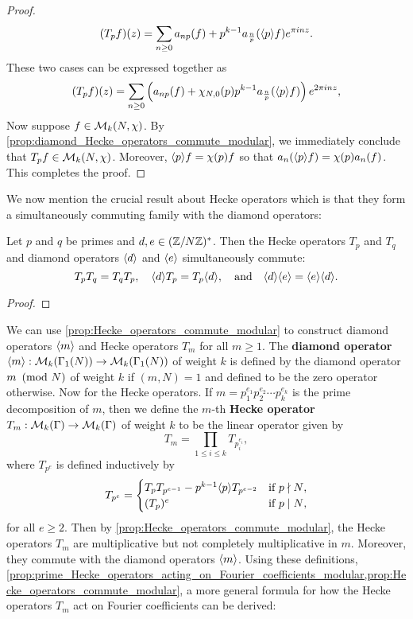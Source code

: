 \begin{proof}
        \[
          (T_{p}f)(z) = \sum_{n \ge 0}a_{np}(f)+p^{k-1}a_{\frac{n}{p}}(\langle p\rangle f)e^{\pi inz}.
        \]
        These two cases can be expressed together as 
        \[
          (T_{p}f)(z) = \sum_{n \ge 0}\left(a_{np}(f)+\chi_{N,0}(p)p^{k-1}a_{\frac{n}{p}}(\langle p\rangle f)\right)e^{2\pi inz},
        \]
        Now suppose $f \in \mathcal{M}_{k}(N,\chi)$. By \cref{prop:diamond_Hecke_operators_commute_modular}, we immediately conclude that $T_{p}f \in \mathcal{M}_{k}(N,\chi)$. Moreover, $\langle p\rangle f = \chi(p)f$ so that $a_{n}(\langle p\rangle f) = \chi(p)a_{n}(f)$. This completes the proof.
      \end{proof}

      We now mention the crucial result about Hecke operators which is that they form a simultaneously commuting family with the diamond operators:

      \begin{proposition}\label{prop:Hecke_operators_commute_modular}
        Let $p$ and $q$ be primes and $d,e \in (\mathbb{Z}/N\mathbb{Z})^{\ast}$. Then the Hecke operators $T_{p}$ and $T_{q}$ and diamond operators $\langle d\rangle$ and $\langle e\rangle$ simultaneously commute:
        \[
          T_{p}T_{q} = T_{q}T_{p}, \quad \langle d\rangle T_{p} = T_{p}\langle d\rangle, \quad \text{and} \quad \langle d\rangle\langle e\rangle = \langle e\rangle\langle d\rangle.
        \]
      \end{proposition}
      \begin{proof}
      \end{proof}

      We can use \cref{prop:Hecke_operators_commute_modular} to construct diamond operators $\langle m\rangle$ and Hecke operators $T_{m}$ for all $m \ge 1$. The \textbf{diamond operator} $\langle m\rangle:\mathcal{M}_{k}(\Gamma_{1}(N)) \to \mathcal{M}_{k}(\Gamma_{1}(N))$ of weight $k$ is defined by the diamond operator $m \ \left(\text{mod }N\right)$ of weight $k$ if $(m,N) = 1$ and defined to be the zero operator otherwise. Now for the Hecke operators. If $m = p_{1}^{e_{1}}p_{2}^{e_{2}} \cdots p_{k}^{e_{k}}$ is the prime decomposition of $m$, then we define the $m$-th \textbf{Hecke operator} $T_{m}:\mathcal{M}_{k}(\Gamma) \to \mathcal{M}_{k}(\Gamma)$ of weight $k$ to be the linear operator given by
      \[
        T_{m} = \prod_{1 \le i \le k}T_{p_{i}^{e_{i}}},
      \]
      where $T_{p^{e}}$ is defined inductively by
      \[
        T_{p^{e}} = \begin{cases} T_{p}T_{p^{e-1}}-p^{k-1}\langle p\rangle T_{p^{e-2}} & \text{if $p \nmid N$}, \\ (T_{p})^{e} & \text{if $p \mid N$}, \end{cases}
      \]
      for all $e \ge 2$. Then by \cref{prop:Hecke_operators_commute_modular}, the Hecke operators $T_{m}$ are multiplicative but not completely multiplicative in $m$. Moreover, they commute with the diamond operators $\langle m\rangle$. Using these definitions, \cref{prop:prime_Hecke_operators_acting_on_Fourier_coefficients_modular,prop:Hecke_operators_commute_modular}, a more general formula for how the Hecke operators $T_{m}$ act on Fourier coefficients can be derived:

